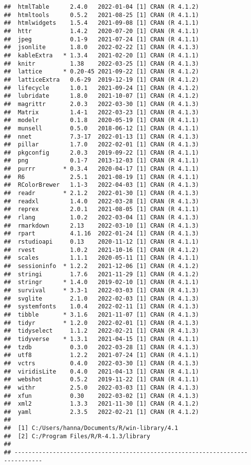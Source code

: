 \documentclass[
]{article}
\begin{document}
\begin{verbatim}
##  htmlTable      2.4.0   2022-01-04 [1] CRAN (R 4.1.2)
##  htmltools      0.5.2   2021-08-25 [1] CRAN (R 4.1.1)
##  htmlwidgets    1.5.4   2021-09-08 [1] CRAN (R 4.1.1)
##  httr           1.4.2   2020-07-20 [1] CRAN (R 4.1.1)
##  jpeg           0.1-9   2021-07-24 [1] CRAN (R 4.1.1)
##  jsonlite       1.8.0   2022-02-22 [1] CRAN (R 4.1.3)
##  kableExtra   * 1.3.4   2021-02-20 [1] CRAN (R 4.1.1)
##  knitr          1.38    2022-03-25 [1] CRAN (R 4.1.3)
##  lattice      * 0.20-45 2021-09-22 [1] CRAN (R 4.1.2)
##  latticeExtra   0.6-29  2019-12-19 [1] CRAN (R 4.1.2)
##  lifecycle      1.0.1   2021-09-24 [1] CRAN (R 4.1.2)
##  lubridate      1.8.0   2021-10-07 [1] CRAN (R 4.1.2)
##  magrittr       2.0.3   2022-03-30 [1] CRAN (R 4.1.3)
##  Matrix         1.4-1   2022-03-23 [1] CRAN (R 4.1.3)
##  modelr         0.1.8   2020-05-19 [1] CRAN (R 4.1.1)
##  munsell        0.5.0   2018-06-12 [1] CRAN (R 4.1.1)
##  nnet           7.3-17  2022-01-13 [1] CRAN (R 4.1.3)
##  pillar         1.7.0   2022-02-01 [1] CRAN (R 4.1.3)
##  pkgconfig      2.0.3   2019-09-22 [1] CRAN (R 4.1.1)
##  png            0.1-7   2013-12-03 [1] CRAN (R 4.1.1)
##  purrr        * 0.3.4   2020-04-17 [1] CRAN (R 4.1.1)
##  R6             2.5.1   2021-08-19 [1] CRAN (R 4.1.1)
##  RColorBrewer   1.1-3   2022-04-03 [1] CRAN (R 4.1.3)
##  readr        * 2.1.2   2022-01-30 [1] CRAN (R 4.1.3)
##  readxl         1.4.0   2022-03-28 [1] CRAN (R 4.1.3)
##  reprex         2.0.1   2021-08-05 [1] CRAN (R 4.1.1)
##  rlang          1.0.2   2022-03-04 [1] CRAN (R 4.1.3)
##  rmarkdown      2.13    2022-03-10 [1] CRAN (R 4.1.3)
##  rpart          4.1.16  2022-01-24 [1] CRAN (R 4.1.3)
##  rstudioapi     0.13    2020-11-12 [1] CRAN (R 4.1.1)
##  rvest          1.0.2   2021-10-16 [1] CRAN (R 4.1.2)
##  scales         1.1.1   2020-05-11 [1] CRAN (R 4.1.1)
##  sessioninfo  * 1.2.2   2021-12-06 [1] CRAN (R 4.1.2)
##  stringi        1.7.6   2021-11-29 [1] CRAN (R 4.1.2)
##  stringr      * 1.4.0   2019-02-10 [1] CRAN (R 4.1.1)
##  survival     * 3.3-1   2022-03-03 [1] CRAN (R 4.1.3)
##  svglite        2.1.0   2022-02-03 [1] CRAN (R 4.1.3)
##  systemfonts    1.0.4   2022-02-11 [1] CRAN (R 4.1.3)
##  tibble       * 3.1.6   2021-11-07 [1] CRAN (R 4.1.3)
##  tidyr        * 1.2.0   2022-02-01 [1] CRAN (R 4.1.3)
##  tidyselect     1.1.2   2022-02-21 [1] CRAN (R 4.1.3)
##  tidyverse    * 1.3.1   2021-04-15 [1] CRAN (R 4.1.1)
##  tzdb           0.3.0   2022-03-28 [1] CRAN (R 4.1.3)
##  utf8           1.2.2   2021-07-24 [1] CRAN (R 4.1.1)
##  vctrs          0.4.0   2022-03-30 [1] CRAN (R 4.1.3)
##  viridisLite    0.4.0   2021-04-13 [1] CRAN (R 4.1.1)
##  webshot        0.5.2   2019-11-22 [1] CRAN (R 4.1.1)
##  withr          2.5.0   2022-03-03 [1] CRAN (R 4.1.3)
##  xfun           0.30    2022-03-02 [1] CRAN (R 4.1.3)
##  xml2           1.3.3   2021-11-30 [1] CRAN (R 4.1.2)
##  yaml           2.3.5   2022-02-21 [1] CRAN (R 4.1.2)
## 
##  [1] C:/Users/hanna/Documents/R/win-library/4.1
##  [2] C:/Program Files/R/R-4.1.3/library
## 
## ------------------------------------------------------------------------------
\end{verbatim}
\end{document}
